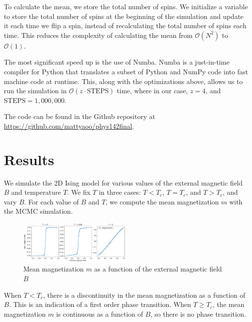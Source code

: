 \documentclass[
 reprint,
 amsmath,
 amssymb,
 aps,
]{revtex4-2}
\begin{document}
To calculate the mean, we store the total number of spins.
We initialize a variable to store the total number of spins at the beginning
of the simulation and update it each time we flip a spin,
instead of recalculating the total number of spins each time.
This reduces the complexity of calculating the mean from 
$ \mathcal{O}(N^{2}) $ to $ \mathcal{O}(1) $.

The most significant speed up is the use of Numba. Numba is a
just-in-time compiler for Python that translates a subset of Python and NumPy
code into fast machine code at runtime.
This, along with the optimizations above, allows us to run the simulation
in $ \mathcal{O}(z\cdot \mathrm{STEPS}) $ time, 
where in our case, $ z = 4 $, and $ \mathrm{STEPS} = 1,000,000 $.

The code can be found in the Github repository at 
\url{https://github.com/mattyaoo/phys142final}.

\section{Results}
\label{sec:results}

We simulate the 2D Ising model for various values of the external magnetic
field $ B $ and temperature $ T $.
We fix $ T $ in three cases: $ T < T_{c} $, $ T=T_{c} $, and $ T > T_{c} $,
and vary $ B $.
For each value of $ B $ and $ T $,
we compute the mean magnetization $ m $ with the MCMC simulation.

\begin{figure}[ht]
\centering
\includegraphics[width=0.5\textwidth]{figures/m_vs_B.pdf}
\caption{Mean magnetization $ m $ as a function of the external magnetic 
field $ B $}
\label{fig:m_vs_B}
\end{figure}

When $ T < T_{c} $, there is a discontinuity in the mean magnetization
as a function of $ B $.
This is an indication of a first order phase transition.
When $ T \geq T_{c} $,
the mean magnetization $ m $ is continuous as a function of $ B $,
so there is no phase transition.
\end{document}
